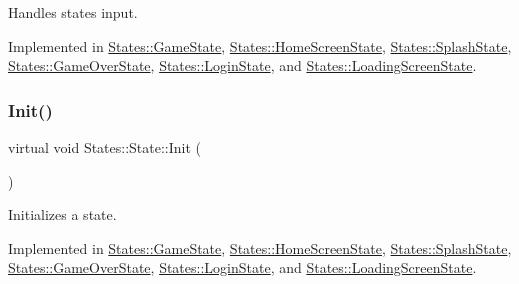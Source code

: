 Handles state\textquotesingle{}s input. 

\begin{DoxyVerb}\end{DoxyVerb}
 

Implemented in \mbox{\hyperlink{class_states_1_1_game_state_a6521d6d97ac2fb388085a70abce704a9}{States\+::\+Game\+State}}, \mbox{\hyperlink{class_states_1_1_home_screen_state_abaada1fbdd186aea2845ea1d19b66d69}{States\+::\+Home\+Screen\+State}}, \mbox{\hyperlink{class_states_1_1_splash_state_a0bd8d0bc42837fa395cc3bc5c53935f2}{States\+::\+Splash\+State}}, \mbox{\hyperlink{class_states_1_1_game_over_state_acc6edd1fdbca63e4564a0a04b9d48811}{States\+::\+Game\+Over\+State}}, \mbox{\hyperlink{class_states_1_1_login_state_a91cc904bfbe100def4cb967f089175f7}{States\+::\+Login\+State}}, and \mbox{\hyperlink{class_states_1_1_loading_screen_state_a3a473b2cf717f183e4573344405b7b49}{States\+::\+Loading\+Screen\+State}}.

\mbox{\label{class_states_1_1_state_aff396dd3b4f3f7f7e729a0eac1910f45}} 
\subsubsection{\texorpdfstring{Init()}{Init()}}
{\footnotesize\ttfamily virtual void States\+::\+State\+::\+Init (\begin{DoxyParamCaption}{ }\end{DoxyParamCaption})\hspace{0.3cm}{\ttfamily [pure virtual]}}



Initializes a state. 

\begin{DoxyVerb}\end{DoxyVerb}
 

Implemented in \mbox{\hyperlink{class_states_1_1_game_state_aeb73979fc3a22b001ed389790e24bd1e}{States\+::\+Game\+State}}, \mbox{\hyperlink{class_states_1_1_home_screen_state_a96524be599607993ac7abc72727cc9b2}{States\+::\+Home\+Screen\+State}}, \mbox{\hyperlink{class_states_1_1_splash_state_a666571efc81c245ed9e2c8c2baaf920b}{States\+::\+Splash\+State}}, \mbox{\hyperlink{class_states_1_1_game_over_state_a72a8dafbebd94c2964ba48ba4a350096}{States\+::\+Game\+Over\+State}}, \mbox{\hyperlink{class_states_1_1_login_state_abe7a51211f07fe9eeac422f548117b49}{States\+::\+Login\+State}}, and \mbox{\hyperlink{class_states_1_1_loading_screen_state_aa6783276ac59b0c137d062251ddc719a}{States\+::\+Loading\+Screen\+State}}.

